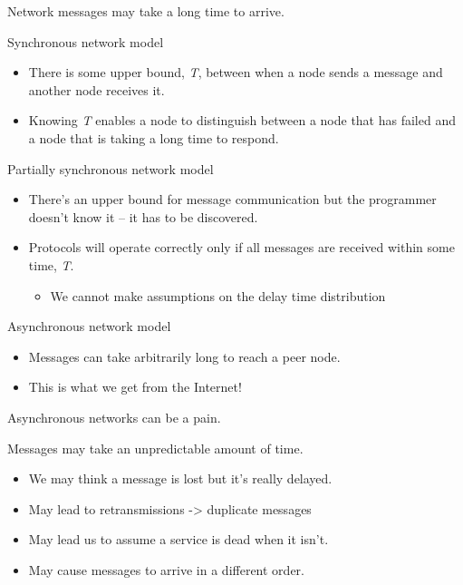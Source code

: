 \begin{slide}

	
	Network messages may take a long time to arrive.
	\bigskip
	
	Synchronous network model
	\begin{itemize}
		\item There is some upper bound, \textit{T}, between when a node sends a message and another node receives it.
		\item Knowing \textit{T} enables a node to distinguish between a node that has failed and a node that is taking a long time to respond.
	\end{itemize}
	
\end{slide}

\begin{slide}

	
	Partially synchronous network model
	\begin{itemize}
		\item There’s an upper bound for message communication but the programmer doesn’t know it – it has to be discovered.
		\item Protocols will operate correctly only if all messages are received within some time, \textit{T}.
		\begin{itemize}
			\item We cannot make assumptions on the delay time distribution
		\end{itemize}
	\end{itemize}
	
\end{slide}

\begin{slide}

	
	Asynchronous network model
	\begin{itemize}
		\item Messages can take arbitrarily long to reach a peer node.
		\item This is what we get from the Internet!
	\end{itemize}
	\bigskip
	
	Asynchronous networks can be a pain.
	\bigskip
	
	Messages may take an unpredictable amount of time.
	\begin{itemize}
		\item We may think a message is lost but it’s really delayed.
		\item May lead to retransmissions -> duplicate messages
		\item May lead us to assume a service is dead when it isn’t.
		\item May cause messages to arrive in a different order.
	\end{itemize}
	
\end{slide}

